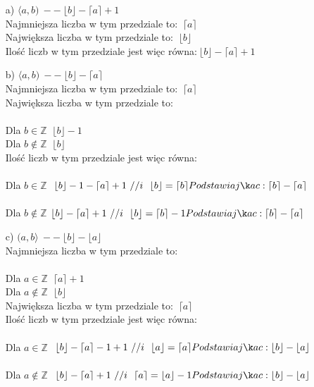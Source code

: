 \documentclass[fleqn]{article}
\begin{document}
 \begin{itemize}
 \item[a)] $\langle a,b) \ -- \ \lfloor b\rfloor - \lceil a\rceil + 1 $\\
  Najmniejsza liczba w tym przedziale to: $\ \lceil a\rceil $\\
  Największa liczba w tym przedziale to: $\ \lfloor b \rfloor $\\
  Ilość liczb w tym przedziale jest więc równa:$\ \lfloor b \rfloor - \lceil a\rceil  + 1 $ \\
  
  \item[b)] $\langle a,b) \ -- \ \lfloor b \rfloor - \lceil a \rceil$\\
  Najmniejsza liczba w tym przedziale to: $\ \lceil a\rceil $\\
  Największa liczba w tym przedziale to: \\ \\
  Dla $b\in\mathbb{Z}$ $\ \lfloor b \rfloor -1 $\\
  Dla $b\notin\mathbb{Z}$ $\ \lfloor b \rfloor $\\
  Ilość liczb w tym przedziale jest więc równa: \\ \\
  Dla $b\in\mathbb{Z}$ $\ \lfloor b\rfloor - 1 - \lceil a\rceil +1 \ // i \ \ \lfloor b\rfloor =\lceil b\rceil  \\Podstawiając:\lceil b\rceil - \lceil a\rceil$\\ \\
  Dla $b\notin\mathbb{Z}$ $\lfloor b\rfloor - \lceil a\rceil +1 \ // i \ \ \lfloor b\rfloor =\lceil b\rceil -1 \\Podstawiając:\lceil b\rceil - \lceil a\rceil $\\
  
  \item[c)] $(a,b\rangle \ -- \ \lfloor b\rfloor - \lfloor a \rfloor$\\
  Najmniejsza liczba w tym przedziale to:\\ \\
  Dla $a\in\mathbb{Z}$ $\ \lceil a\rceil + 1 $\\
  Dla $a\notin\mathbb{Z}$ $\ \lfloor b \rfloor $\\
  Największa liczba w tym przedziale to: $\ \lceil a\rceil$\\
  Ilość liczb w tym przedziale jest więc równa:\\ \\
  Dla $a\in\mathbb{Z}$ $\ \lfloor b\rfloor - \lceil a\rceil-1 +1 \ // i \ \ \lfloor a\rfloor =\lceil a\rceil  \\Podstawiając:\lfloor b\rfloor - \lfloor a\rfloor $\\ \\
  Dla $a\notin\mathbb{Z}$ $\ \lfloor b\rfloor - \lceil a\rceil+1 \ // i \ \ \lceil a\rceil  =\lfloor a\rfloor-1  \\Podstawiając:\lfloor b\rfloor - \lfloor a\rfloor$\\


\end{itemize}
\end{document}
